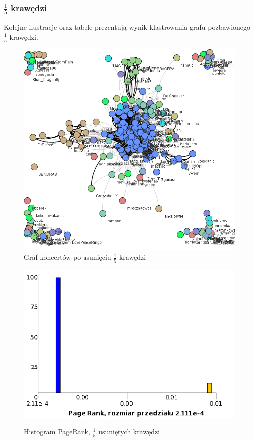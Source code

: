 \documentclass[10pt,a4paper]{article}
\begin{document}
\subsubsection {$\frac{1}{5}$ krawędzi}
  Kolejne ilustracje oraz tabele prezentują wynik klastrowania grafu pozbawionego  $\frac{1}{5}$  krawędzi.
\begin{figure}[H]
\centering
\caption{Graf koncertów po usunięciu $\frac{1}{5}$ krawędzi}
\includegraphics[scale=0.5]{wyniki/final200Events/1200events.png}
\end{figure}

\begin{figure}[H]
\centering
\caption{Histogram PageRank, $\frac{1}{5}$ usuniętych krawędzi}
\includegraphics[scale=0.6]{wyniki/final200Events/1200eventsPRHist.png}
\label{fig:1200lovedPRHist}
\end{figure}
\end{document}
